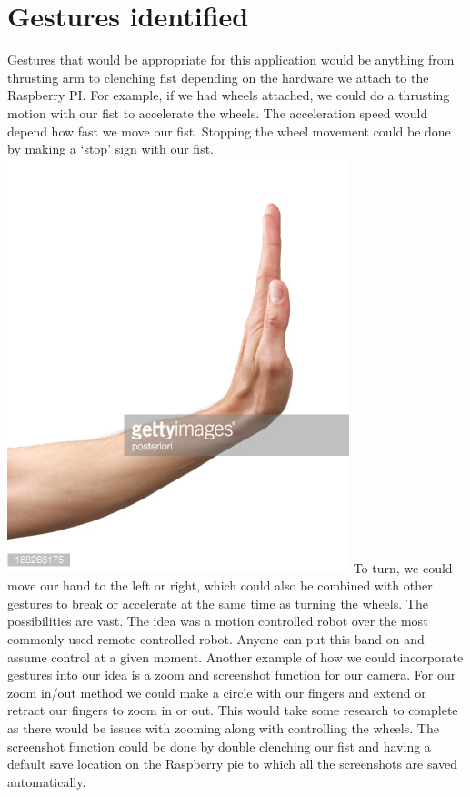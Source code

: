 \documentclass[12pt,a4paper,oneside,openany]{book}
\begin{document}
\chapter*{Gestures identified}
Gestures that would be appropriate for this application would be anything from thrusting arm to clenching fist depending on the hardware we attach to the Raspberry PI. For example, if we had wheels attached, we could do a thrusting motion with our fist to accelerate the wheels. The acceleration speed would depend how fast we move our fist. Stopping the wheel movement could be done by making a ‘stop’ sign with our fist.
\includegraphics{stop.jpg}
To turn, we could move our hand to the left or right, which could also be combined with other gestures to break or accelerate at the same time as turning the wheels. The possibilities are vast.
The idea was a motion controlled robot over the most commonly used remote controlled robot. Anyone can put this band on and assume control at a given moment.
Another example of how we could incorporate gestures into our idea is a zoom and screenshot function for our camera. For our zoom in/out method we could make a circle with our fingers and extend or retract our fingers to zoom in or out. This would take some research to complete as there would be issues with zooming along with controlling the wheels. The screenshot function could be done by double clenching our fist and having a default save location on the Raspberry pie to which all the screenshots are saved automatically. 
\end{document}
